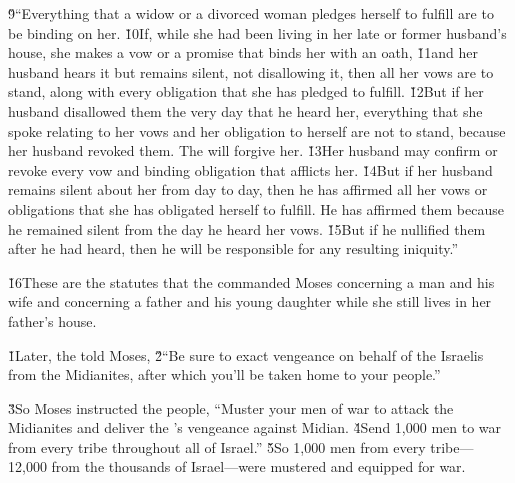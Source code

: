 \v{9}``Everything that a widow or a divorced woman pledges herself to fulfill are to be binding on her. \v{10}If, while she had been living in her late or former husband's house, she makes a vow or a promise that binds her with an oath, \v{11}and her husband hears it but remains silent, not disallowing it, then all her vows are to stand, along with every obligation that she has pledged to fulfill. \v{12}But if her husband disallowed them the very day that he heard her, everything that she spoke relating to her vows and her obligation to herself are not to stand, because her husband revoked them. The  will forgive her. \v{13}Her husband may confirm or revoke every vow and binding obligation that afflicts her. \v{14}But if her husband remains silent about her from day to day, then he has affirmed all her vows or obligations that she has obligated herself to fulfill. He has affirmed them because he remained silent from the day he heard her vows. \v{15}But if he nullified them after he had heard, then he will be responsible for any resulting iniquity.''

\v{16}These are the statutes that the  commanded Moses concerning a man and his wife and concerning a father and his young daughter while she still lives in her father's house.

\v{1}Later, the  told Moses, \v{2}``Be sure to exact vengeance on behalf of the Israelis from the Midianites, after which you'll be taken home to your people.''

\v{3}So Moses instructed the people, ``Muster your men of war to attack the Midianites and deliver the 's vengeance against Midian. \v{4}Send 1,000 men to war from every tribe throughout all of Israel.'' \v{5}So 1,000 men from every tribe---12,000 from the thousands of Israel---were mustered and equipped for war.


